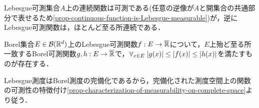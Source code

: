 \documentclass[uplatex, dvipdfmx]{jsreport}
\begin{document}
\begin{tcolorbox}[colframe=ForestGreen, colback=ForestGreen!10!white,breakable,colbacktitle=ForestGreen!40!white,coltitle=black,fonttitle=\bfseries\sffamily,
    title=]
    Lebesgue可測集合$A$上の連続関数は可測である(任意の逆像が$A$と開集合の共通部分で表せるため\ref{prop-continuous-function-is-Lebesgue-measurable})が，逆にLebesgue可測関数は，ほとんど至る所連続である．
\end{tcolorbox}
    

\begin{theorem}\label{thm-Lebesgue-measurability-in-terms-of-Borel-measurability}
    Borel集合$E\in\mathcal{B}(\mathbb{R}^d)$上のLebesgue可測関数$f:E\to\overline{\mathbb{R}}$について，$E$上殆ど至る所一致するBorel可測関数$g,h:E\to\overline{\mathbb{R}}$で，$\forall_{x\in E}\;\lvert g(x)\rvert\le\lvert f(x)\rvert\le\lvert h(x)\rvert$を満たすものが存在する．
\end{theorem}
\begin{Proof}
    Lebesgue測度はBorel測度の完備化であるから，完備化された測度空間上の関数の可測性の特徴付け\ref{prop-characterization-of-measurability-on-complete-space}より従う．
\end{Proof}
\end{document}
